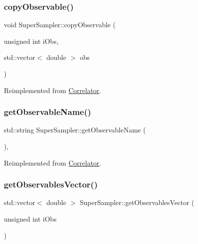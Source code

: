 \subsubsection{\texorpdfstring{copyObservable()}{copyObservable()}}
{\footnotesize\ttfamily void Super\+Sampler\+::copy\+Observable (\begin{DoxyParamCaption}\item[{unsigned int}]{i\+Obs,  }\item[{std\+::vector$<$ double $>$}]{obs }\end{DoxyParamCaption})\hspace{0.3cm}{\ttfamily [virtual]}}



Reimplemented from \mbox{\hyperlink{class_correlator_ac780d8b180294ee4801ede6e6a13f7f4}{Correlator}}.

\mbox{\label{class_super_sampler_a84d3ba9a56dd2a36cb11d495c32f5ca6}} 
\subsubsection{\texorpdfstring{getObservableName()}{getObservableName()}}
{\footnotesize\ttfamily std\+::string Super\+Sampler\+::get\+Observable\+Name (\begin{DoxyParamCaption}{ }\end{DoxyParamCaption})\hspace{0.3cm}{\ttfamily [inline]}, {\ttfamily [virtual]}}



Reimplemented from \mbox{\hyperlink{class_correlator_ad1fa59e864917c3e48da037f90c3488f}{Correlator}}.

\mbox{\label{class_super_sampler_a2b81588289576169c2148a88ddad482f}} 
\subsubsection{\texorpdfstring{getObservablesVector()}{getObservablesVector()}}
{\footnotesize\ttfamily std\+::vector$<$ double $>$ Super\+Sampler\+::get\+Observables\+Vector (\begin{DoxyParamCaption}\item[{unsigned int}]{i\+Obs }\end{DoxyParamCaption})\hspace{0.3cm}{\ttfamily [virtual]}}



